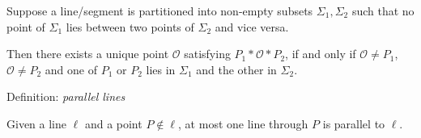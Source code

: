 \begin{minipage}[t]{0.48\linewidth}
\phantom{bob}\smallbreak

Suppose a line/segment is partitioned into non-empty subsets $\Sigma_1,\Sigma_2$ such that no point of $\Sigma_1$ lies between two points of $\Sigma_2$ and vice versa.\par
Then there exists a unique point $\mathcal O$ satisfying $P_1*\mathcal O*P_2$, if and only if $\mathcal O\neq P_1$, $\mathcal O\neq P_2$ and one of $P_1$ or $P_2$ lies in $\Sigma_1$ and the other in $\Sigma_2$.\medbreak



\phantom{bob}\smallbreak

Definition: \emph{parallel lines}\smallbreak

Given a line $\ell$ and a point $P\notin\ell$, at most one line through $P$ is parallel to $\ell$.
\end{minipage}


\clearpage



